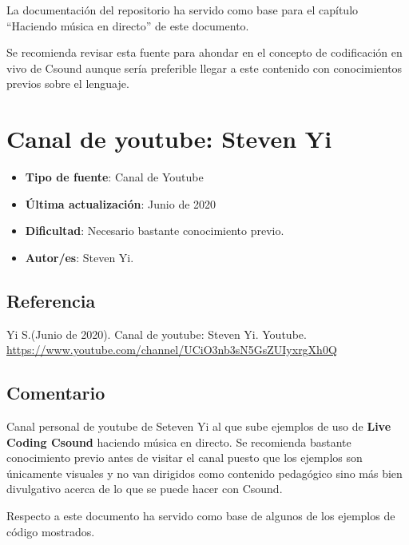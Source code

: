 La documentación del repositorio ha servido como base para el capítulo ``Haciendo música en directo'' de este documento.

Se recomienda revisar esta fuente para ahondar en el concepto de codificación en vivo de Csound aunque sería preferible llegar a este contenido con conocimientos previos sobre el lenguaje.
 
\section{Canal de youtube: Steven Yi}

 \begin{itemize}
 \item \textbf{Tipo de fuente}: Canal de Youtube
 
 \item \textbf{Última actualización}: Junio de 2020
 
 \item \textbf{Dificultad}: Necesario bastante conocimiento previo.
 
 \item \textbf{Autor/es}: Steven Yi.
 \end{itemize}

\subsection{Referencia}

Yi S.(Junio de 2020). Canal de youtube: Steven Yi. Youtube. \url{https://www.youtube.com/channel/UCiO3nb3sN5GsZUIyxrgXh0Q}

\subsection{Comentario}

Canal personal de youtube de Seteven Yi al que sube ejemplos de uso de \textbf{Live Coding Csound} haciendo música en directo. Se recomienda bastante conocimiento previo antes de visitar el canal puesto que los ejemplos son únicamente visuales y no van dirigidos como contenido pedagógico sino más bien divulgativo acerca de lo que se puede hacer con Csound.

Respecto a este documento ha servido como base de algunos de los ejemplos de código mostrados.